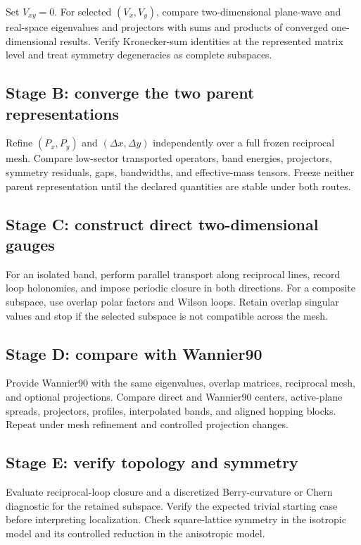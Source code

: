 Set $V_{xy}=0$. For selected $(V_x,V_y)$, compare two-dimensional plane-wave
and real-space eigenvalues and projectors with sums and products of converged
one-dimensional results. Verify Kronecker-sum identities at the represented
matrix level and treat symmetry degeneracies as complete subspaces.

\subsection*{Stage B: converge the two parent representations}

Refine $(P_x,P_y)$ and $(\Delta x,\Delta y)$ independently over a full frozen
reciprocal mesh. Compare low-sector transported operators, band energies,
projectors, symmetry residuals, gaps, bandwidths, and effective-mass tensors.
Freeze neither parent representation until the declared quantities are stable
under both routes.

\subsection*{Stage C: construct direct two-dimensional gauges}

For an isolated band, perform parallel transport along reciprocal lines, record
loop holonomies, and impose periodic closure in both directions. For a
composite subspace, use overlap polar factors and Wilson loops. Retain overlap
singular values and stop if the selected subspace is not compatible across the
mesh.

\subsection*{Stage D: compare with Wannier90}

Provide Wannier90 with the same eigenvalues, overlap matrices, reciprocal mesh,
and optional projections. Compare direct and Wannier90 centers, active-plane
spreads, projectors, profiles, interpolated bands, and aligned hopping blocks.
Repeat under mesh refinement and controlled projection changes.

\subsection*{Stage E: verify topology and symmetry}

Evaluate reciprocal-loop closure and a discretized Berry-curvature or Chern
diagnostic for the retained subspace. Verify the expected trivial starting
case before interpreting localization. Check square-lattice symmetry in the
isotropic model and its controlled reduction in the anisotropic model.

